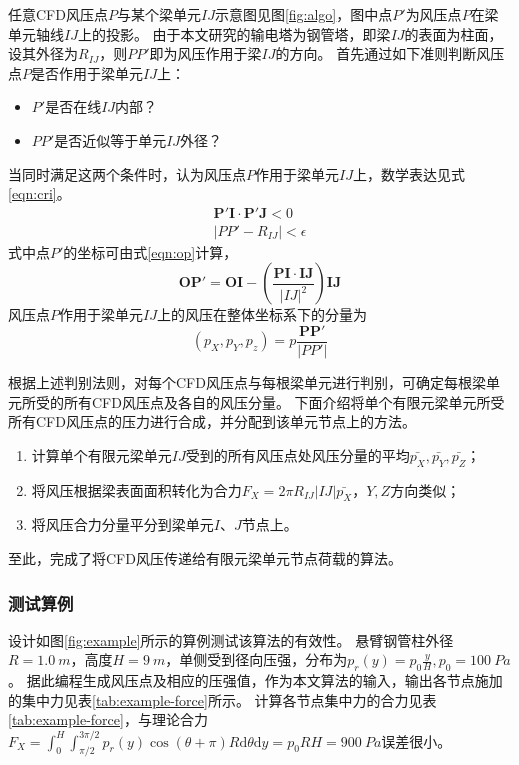 任意CFD风压点$P$与某个梁单元$IJ$示意图见图\ref{fig:algo}，图中点$P'$为风压点$P$在梁单元轴线$IJ$上的投影。
由于本文研究的输电塔为钢管塔，即梁$IJ$的表面为柱面，设其外径为$R_{IJ}$，则$PP'$即为风压作用于梁$IJ$的方向。
首先通过如下准则判断风压点$P$是否作用于梁单元$IJ$上：
\begin{itemize}
	\item $P'$是否在线$IJ$内部？
	\item $PP'$是否近似等于单元$IJ$外径？
\end{itemize}
当同时满足这两个条件时，认为风压点$P$作用于梁单元$IJ$上，数学表达见式\eqref{eqn:cri}。
\begin{gather}\label{eqn:cri}
	\bm{P'I}\cdot\bm{P'J} < 0  \nonumber \\
	|PP'-R_{IJ}| < \epsilon
\end{gather}
式中点$P'$的坐标可由式\eqref{eqn:op}计算，
\begin{equation}\label{eqn:op}
	\bm{OP'}=\bm{OI} - \left( \frac{\bm{PI}\cdot\bm{IJ}}{|IJ|^2} \right)\bm{IJ}
\end{equation}
风压点$P$作用于梁单元$IJ$上的风压在整体坐标系下的分量为
\begin{equation}
	(p_X, p_Y, p_z) = p\frac{\bm{PP'}}{|PP'|}
\end{equation}

根据上述判别法则，对每个CFD风压点与每根梁单元进行判别，可确定每根梁单元所受的所有CFD风压点及各自的风压分量。
下面介绍将单个有限元梁单元所受所有CFD风压点的压力进行合成，并分配到该单元节点上的方法。
\begin{enumerate}
	\item 计算单个有限元梁单元$IJ$受到的所有风压点处风压分量的平均$\bar{p_X},\bar{p_Y},\bar{p_Z}$；
	\item 将风压根据梁表面面积转化为合力$F_X=2\pi R_{IJ} |IJ| \bar{p_X}$，$Y,Z$方向类似；
	\item 将风压合力分量平分到梁单元$I$、$J$节点上。
\end{enumerate}
至此，完成了将CFD风压传递给有限元梁单元节点荷载的算法。

\subsubsection{测试算例}
设计如图\ref{fig:example}所示的算例测试该算法的有效性。
悬臂钢管柱外径$R=\SI{1.0}{m}$，高度$H=\SI{9}{m}$，单侧受到径向压强，分布为$p_r(y)=p_0\frac{y}{H},p_0=\SI{100}{Pa}$。
据此编程生成风压点及相应的压强值，作为本文算法的输入，输出各节点施加的集中力见表\ref{tab:example-force}所示。
计算各节点集中力的合力见表\ref{tab:example-force}，与理论合力$F_X = \int_{0}^{H}\int_{\pi/2}^{3\pi/2}p_r(y)\cos(\theta+\pi)R \mathrm{d} \theta \mathrm{d} y = p_0 RH=\SI{900}{Pa}$误差很小。


